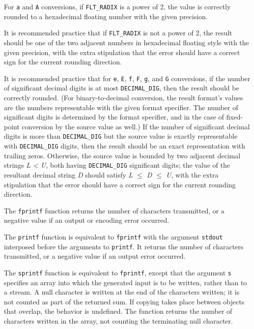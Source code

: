 For \texttt{a} and \texttt{A} conversions, if \texttt{FLT\_RADIX} is a power of
2, the value is correctly rounded to a hexadecimal floating number with the
given precision.

It is recommended practice that if \texttt{FLT\_RADIX} is not a power of 2, the
result should be one of the two adjacent numbers in hexadecimal floating style
with the given precision, with the extra stipulation that the error should have
a correct sign for the current rounding direction.

It is recommended practice that for \texttt{e}, \texttt{E}, \texttt{f},
\texttt{F}, \texttt{g}, and \texttt{G} conversions, if the number of
significant decimal digits is at most \texttt{DECIMAL\_DIG}, then the result
should be correctly rounded. (For binary-to-decimal conversion, the result
format's values are the numbers representable with the given format specifier.
The number of significant digits is determined by the format specifier, and in
the case of fixed-point conversion by the source value as well.) If the number
of significant decimal digits is more than \texttt{DECIMAL\_DIG} but the source
value is exactly representable with \texttt{DECIMAL\_DIG} digits, then the
result should be an exact representation with trailing zeros. Otherwise, the
source value is bounded by two adjacent decimal strings \emph{L \textless{} U},
both having \texttt{DECIMAL\_DIG} significant digits; the value of the
resultant decimal string \emph{D} should satisfy \emph{L $ \leq $ D $ \leq $
U}, with the extra stipulation that the error should have a correct sign for
the current rounding direction.

The \texttt{fprintf} function returns the number of characters transmitted, or
a negative value if an output or encoding error occurred.

The \texttt{printf} function is equivalent to \texttt{fprintf} with the
argument \texttt{stdout} interposed before the arguments to \texttt{printf}. It
returns the number of characters transmitted, or a negative value if an output
error occurred.

The \texttt{sprintf} function is equivalent to \texttt{fprintf}, except that
the argument \texttt{s} specifies an array into which the generated input is to
be written, rather than to a stream. A null character is written at the end of
the characters written; it is not counted as part of the returned sum. If
copying takes place between objects that overlap, the behavior is undefined.
The function returns the number of characters written in the array, not
counting the terminating null character.

